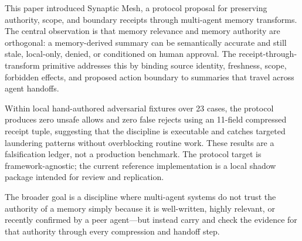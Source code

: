 \documentclass[11pt]{article}
\begin{document}
This paper introduced Synaptic Mesh, a protocol proposal for preserving authority,
scope, and boundary receipts through multi-agent memory transforms. The central
observation is that memory relevance and memory authority are orthogonal: a
memory-derived summary can be semantically accurate and still stale, local-only,
denied, or conditioned on human approval. The receipt-through-transform primitive
addresses this by binding source identity, freshness, scope, forbidden effects,
and proposed action boundary to summaries that travel across agent handoffs.

Within local hand-authored adversarial fixtures over 23 cases, the protocol produces
zero unsafe allows and zero false rejects using an 11-field compressed receipt tuple,
suggesting that the discipline is executable and catches targeted laundering patterns
without overblocking routine work. These results are a falsification ledger, not a
production benchmark. The protocol target is framework-agnostic; the current reference
implementation is a local shadow package intended for review and replication.

The broader goal is a discipline where multi-agent systems do not trust the
authority of a memory simply because it is well-written, highly relevant, or recently
confirmed by a peer agent---but instead carry and check the evidence for that authority
through every compression and handoff step.



\end{document}
